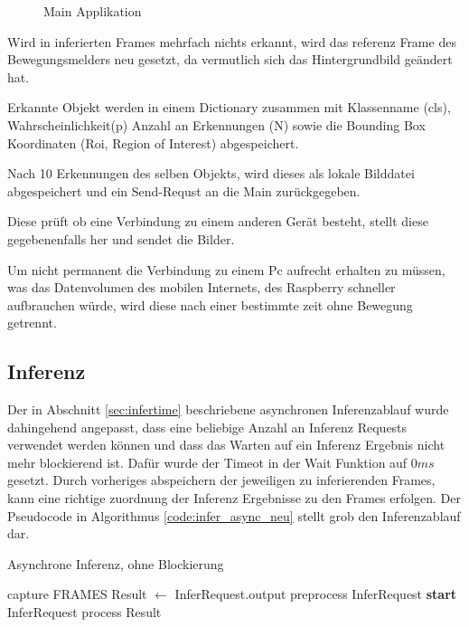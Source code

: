 \vspace{1cm}
\begin{figure}[H]
    \centering
        
    \caption{Main Applikation}
    \label{fig:flowchart_appl}
\end{figure}
\vspace{1cm}

Wird in inferierten Frames mehrfach nichts 
erkannt, wird das referenz Frame des 
Bewegungsmelders neu gesetzt, 
da vermutlich sich das Hintergrundbild 
geändert hat.

Erkannte Objekt werden in einem Dictionary zusammen 
mit Klassenname (cls), Wahrscheinlichkeit(p)
Anzahl an Erkennungen (N) sowie die Bounding 
Box Koordinaten (Roi, Region of Interest) 
abgespeichert.

Nach 10 Erkennungen des selben Objekts, wird dieses 
als lokale Bilddatei abgespeichert und ein 
Send-Requst an die Main zurückgegeben.

Diese prüft ob eine Verbindung zu einem 
anderen Gerät besteht, stellt diese gegebenenfalls her 
und sendet die Bilder.

Um nicht permanent die Verbindung zu einem Pc aufrecht erhalten 
zu müssen, was das Datenvolumen des mobilen Internets, des 
Raspberry schneller aufbrauchen würde, wird diese nach einer 
bestimmte zeit ohne Bewegung getrennt.


\subsection*{Inferenz}

Der in Abschnitt \ref{sec:infertime} beschriebene asynchronen
Inferenzablauf wurde dahingehend angepasst, dass eine beliebige Anzahl 
an Inferenz Requests verwendet werden können 
und dass das Warten auf ein Inferenz Ergebnis
nicht mehr blockierend ist.
Dafür wurde der Timeot in der Wait Funktion auf 
$0ms$ gesetzt.
Durch vorheriges abspeichern der jeweiligen zu 
inferierenden Frames, kann eine richtige zuordnung 
der Inferenz Ergebnisse zu den Frames erfolgen.
Der Pseudocode in Algorithmus \ref{code:infer_async_neu} stellt
grob den Inferenzablauf dar.

\begin{algorithm}[H]
    \caption{Asynchrone Inferenz, ohne Blockierung}
    \label{code:infer_async_neu}
    \begin{algorithmic}
    \WHILE{\TRUE}
    \STATE capture FRAMES
                \STATE Result $\leftarrow$ InferRequest.output
            \ENDIF
                \STATE preprocess InferRequest
                \STATE \textbf{start} InferRequest
            \ENDIF
                \STATE process Result
            \ENDIF
        \ENDFOR
    \ENDWHILE
    \end{algorithmic}
\end{algorithm}    





